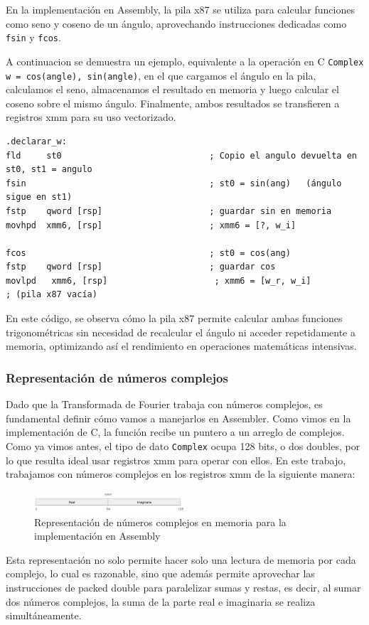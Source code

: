 \documentclass[a4paper]{article}
\begin{document}
En la implementación en Assembly, la pila x87 se utiliza para calcular funciones como seno y coseno de un ángulo, aprovechando instrucciones dedicadas como
\texttt{fsin} y \texttt{fcos}.

A continuacion se demuestra un ejemplo, equivalente a la operación en C \texttt{Complex w = {cos(angle), sin(angle)}}, en el que cargamos el ángulo en la pila, calculamos el seno, almacenamos el resultado en memoria y luego calcular el coseno sobre el mismo ángulo. Finalmente, ambos resultados se transfieren a registros xmm para su uso vectorizado.

\begin{verbatim}
.declarar_w:
fld     st0                             ; Copio el angulo devuelta en st0, st1 = angulo
fsin                                    ; st0 = sin(ang)   (ángulo sigue en st1)
fstp    qword [rsp]                     ; guardar sin en memoria
movhpd  xmm6, [rsp]                     ; xmm6 = [?, w_i]

fcos                                    ; st0 = cos(ang)
fstp    qword [rsp]                     ; guardar cos
movlpd   xmm6, [rsp]                     ; xmm6 = [w_r, w_i]
; (pila x87 vacía)
\end{verbatim}

En este código, se observa cómo la pila x87 permite calcular ambas funciones trigonométricas sin necesidad de recalcular el ángulo ni acceder repetidamente a memoria, optimizando así el rendimiento en operaciones matemáticas intensivas.


\subsubsection{Representación de números complejos}
Dado que la Transformada de Fourier trabaja con números complejos, es fundamental definir cómo vamos a manejarlos en Assembler. Como vimos en la implementación de C, la función recibe un puntero a un arreglo de complejos. Como ya vimos antes, el tipo de dato \texttt{Complex} ocupa 128 bits, o dos doubles, por lo que resulta ideal usar registros xmm para operar con ellos. En este trabajo, trabajamos con números complejos en los registros xmm de la siguiente manera:

\begin{figure}[h]
    \centering
    \includegraphics[width=0.5\textwidth]{extra/xmm complex.png}
    \caption{Representación de números complejos en memoria para la implementación en Assembly}
    \label{fig:asm_complex_representation}
\end{figure}
Esta representación no solo permite hacer solo una lectura de memoria por cada complejo, lo cual es razonable, sino que además permite aprovechar las instrucciones de packed double para paralelizar sumas y restas, es decir, al sumar dos números complejos, la suma de la parte real e imaginaria se realiza simultáneamente.
\end{document}
